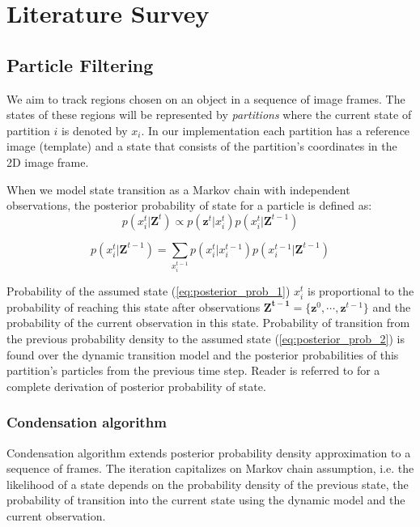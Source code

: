 \documentclass[a4paper, 12pt, oneside]{Thesis}  %
\begin{document}
\chapter{Literature Survey} 
\label{ch:literature_survey}
\section{Particle Filtering}
\label{sec:particle_filtering}
We aim to track regions chosen on an object in a sequence of image frames. The states of these regions will be represented by \textit{partitions} where the current state of partition $i$ is denoted by $x_i$. In our implementation each partition has a reference image (template) and a state that consists of the partition's coordinates in the 2D image frame. 

When we model state transition as a Markov chain with independent observations, the posterior probability of state for a particle is defined as:
\begin{equation}
\label{eq:posterior_prob_1}
p(x_i^t|\mathbf{Z}^t) \propto p(\mathbf{z}^t|x_i^t)p(x_i^t|\mathbf{Z}^{t-1})
\end{equation}

\begin{equation}
\label{eq:posterior_prob_2}
p(x_i^t|\mathbf{Z}^{t-1}) = \sum_{x_i^{t-1}} p(x_i^t|x_i^{t-1})p(x_i^{t-1}|\mathbf{Z}^{t-1})
\end{equation} 

Probability of the assumed state (\ref{eq:posterior_prob_1}) $x_i^t$ is proportional to the probability of reaching this state after observations $\mathbf{Z^{t-1}}=\{\mathbf{z}^{0},\cdots,\mathbf{z}^{t-1}\}$ and the probability of the current observation in this state. Probability of transition from the previous probability density to the assumed state (\ref{eq:posterior_prob_2}) is found over the dynamic transition model and the posterior probabilities of this partition's particles from the previous time step. Reader is referred to \cite{Isard98condensation} for a complete derivation of posterior probability of state. 

\subsection{Condensation algorithm}
\label{sec:condensation}
Condensation algorithm \cite{Isard98condensation} extends posterior probability density approximation to a sequence of frames. The iteration capitalizes on Markov chain assumption, i.e. the likelihood of a state depends on the probability density of the previous state, the probability of transition into the current state using the dynamic model and the current observation. 
\end{document}
